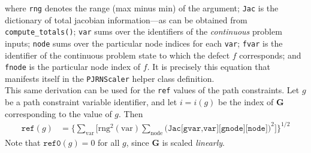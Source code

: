 \documentclass{article}
\theoremstyle{definition}
\begin{document}
where \texttt{rng} denotes the range (max minus min) of the argument; \texttt{Jac} is the dictionary of total jacobian information---as can be obtained from \texttt{compute\_totals()}; \texttt{var} sums over the identifiers of the \textit{continuous} problem inputs; \texttt{node} sums over the particular node indices for each \texttt{var}; \texttt{fvar} is the identifier of the continuous problem state to which the defect $f$ corresponds; and \texttt{fnode} is the particular node index of $f$. It is precisely this equation that manifests itself in the \texttt{PJRNScaler} helper class definition. \\
This same derivation can be used for the \texttt{ref} values of the path constraints. Let $g$ be a path constraint variable identifier, and let $i = i(g)$ be the index of $\textbf{G}$ corresponding to the value of $g$. Then
\begin{align*}
    \texttt{ref}(g) &= \Big\{ \sum_{\text{var}} \Big[ \text{rng}^2(\text{var}) \sum_{\text{node}} \Big( \texttt{Jac[gvar,var][gnode][node]} \Big)^2 \Big] \Big\}^{1/2}
\end{align*}
Note that $\texttt{ref0}(g) = 0$ for all $g$, since $\textbf{G}$ is scaled \textit{linearly}. \\
\end{document}
